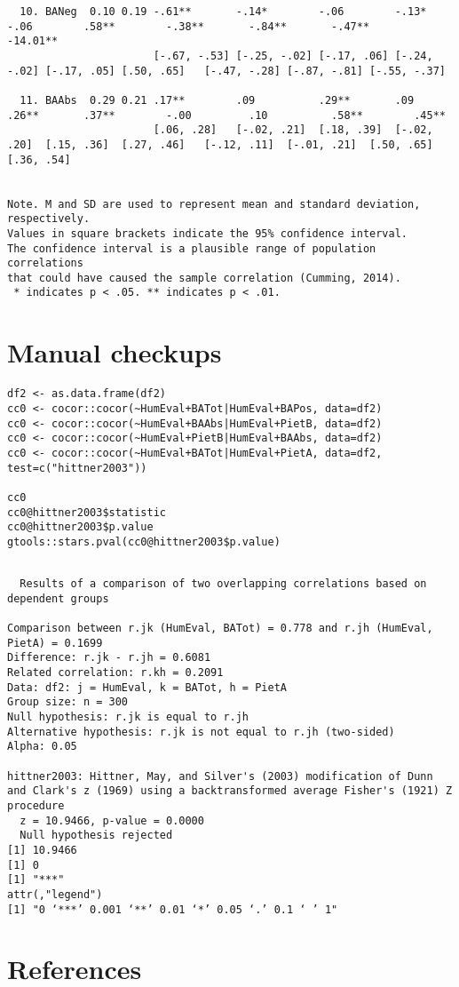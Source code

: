 \documentclass[a4paper,10pt,onecolumn,oneside,openright]{article}
\begin{document}
\begin{verbatim}
  10. BANeg  0.10 0.19 -.61**       -.14*        -.06        -.13*        -.06        .58**        -.38**       -.84**       -.47**                  -14.01**
                       [-.67, -.53] [-.25, -.02] [-.17, .06] [-.24, -.02] [-.17, .05] [.50, .65]   [-.47, -.28] [-.87, -.81] [-.55, -.37]

  11. BAAbs  0.29 0.21 .17**        .09          .29**       .09          .26**       .37**        -.00         .10          .58**        .45**
                       [.06, .28]   [-.02, .21]  [.18, .39]  [-.02, .20]  [.15, .36]  [.27, .46]   [-.12, .11]  [-.01, .21]  [.50, .65]   [.36, .54]


Note. M and SD are used to represent mean and standard deviation, respectively.
Values in square brackets indicate the 95% confidence interval.
The confidence interval is a plausible range of population correlations
that could have caused the sample correlation (Cumming, 2014).
 * indicates p < .05. ** indicates p < .01.
\end{verbatim}
\section{Manual checkups}
\label{sec:org89a146b}
\begin{verbatim}
df2 <- as.data.frame(df2)
cc0 <- cocor::cocor(~HumEval+BATot|HumEval+BAPos, data=df2)
cc0 <- cocor::cocor(~HumEval+BAAbs|HumEval+PietB, data=df2)
cc0 <- cocor::cocor(~HumEval+PietB|HumEval+BAAbs, data=df2)
cc0 <- cocor::cocor(~HumEval+BATot|HumEval+PietA, data=df2, test=c("hittner2003"))

cc0
cc0@hittner2003$statistic
cc0@hittner2003$p.value
gtools::stars.pval(cc0@hittner2003$p.value)
\end{verbatim}

\begin{verbatim}

  Results of a comparison of two overlapping correlations based on dependent groups

Comparison between r.jk (HumEval, BATot) = 0.778 and r.jh (HumEval, PietA) = 0.1699
Difference: r.jk - r.jh = 0.6081
Related correlation: r.kh = 0.2091
Data: df2: j = HumEval, k = BATot, h = PietA
Group size: n = 300
Null hypothesis: r.jk is equal to r.jh
Alternative hypothesis: r.jk is not equal to r.jh (two-sided)
Alpha: 0.05

hittner2003: Hittner, May, and Silver's (2003) modification of Dunn and Clark's z (1969) using a backtransformed average Fisher's (1921) Z procedure
  z = 10.9466, p-value = 0.0000
  Null hypothesis rejected
[1] 10.9466
[1] 0
[1] "***"
attr(,"legend")
[1] "0 ‘***’ 0.001 ‘**’ 0.01 ‘*’ 0.05 ‘.’ 0.1 ‘ ’ 1"
\end{verbatim}


\section*{References}
\label{sec:org944a619}

\printbibliography[heading=none]
\end{document}
